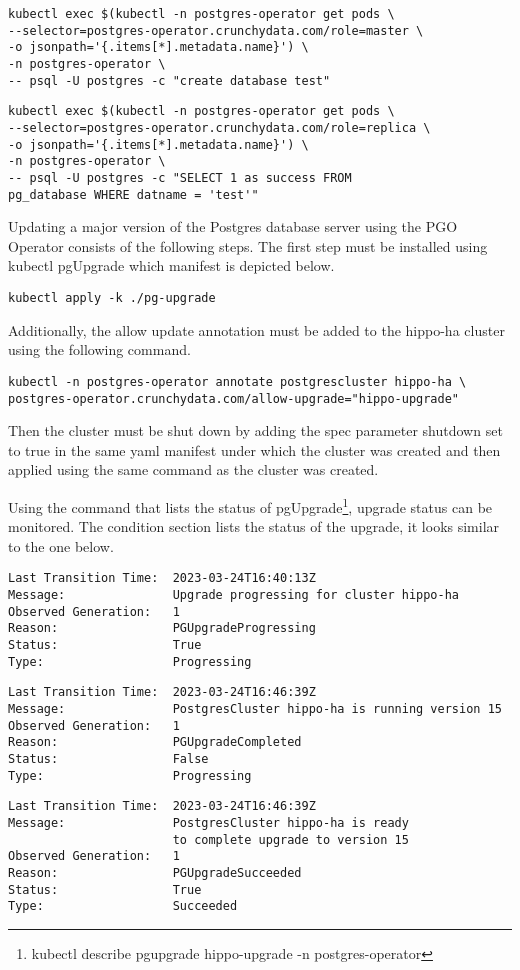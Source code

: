 \begin{verbatim}
kubectl exec $(kubectl -n postgres-operator get pods \
--selector=postgres-operator.crunchydata.com/role=master \
-o jsonpath='{.items[*].metadata.name}') \
-n postgres-operator \
-- psql -U postgres -c "create database test"
\end{verbatim}
\begin{verbatim}
kubectl exec $(kubectl -n postgres-operator get pods \
--selector=postgres-operator.crunchydata.com/role=replica \
-o jsonpath='{.items[*].metadata.name}') \
-n postgres-operator \
-- psql -U postgres -c "SELECT 1 as success FROM 
pg_database WHERE datname = 'test'"
\end{verbatim}

\n{3}{Cluster update to a newer version}
\label{chap:pgoupdate}
Updating a major version of the Postgres database server using the PGO Operator consists of the following steps. The first step must be installed using kubectl pgUpgrade which manifest is depicted below.
\begin{verbatim}
kubectl apply -k ./pg-upgrade
\end{verbatim}

Additionally, the allow update annotation must be added to the hippo-ha cluster using the following command.
\begin{verbatim}
kubectl -n postgres-operator annotate postgrescluster hippo-ha \
postgres-operator.crunchydata.com/allow-upgrade="hippo-upgrade"
\end{verbatim}


Then the cluster must be shut down by adding the spec parameter shutdown set to true in the same yaml manifest under which the cluster was created and then applied using the same command as the cluster was created.

Using the command that lists the status of pgUpgrade\footnote{kubectl describe pgupgrade hippo-upgrade -n postgres-operator}, upgrade status can be monitored. The condition section lists the status of the upgrade, it looks similar to the one below.

\begin{verbatim}
Last Transition Time:  2023-03-24T16:40:13Z
Message:               Upgrade progressing for cluster hippo-ha
Observed Generation:   1
Reason:                PGUpgradeProgressing
Status:                True
Type:                  Progressing
\end{verbatim}
\begin{verbatim}
Last Transition Time:  2023-03-24T16:46:39Z
Message:               PostgresCluster hippo-ha is running version 15
Observed Generation:   1
Reason:                PGUpgradeCompleted
Status:                False
Type:                  Progressing
\end{verbatim}
\begin{verbatim}
Last Transition Time:  2023-03-24T16:46:39Z
Message:               PostgresCluster hippo-ha is ready 
                       to complete upgrade to version 15
Observed Generation:   1
Reason:                PGUpgradeSucceeded
Status:                True
Type:                  Succeeded
\end{verbatim}

